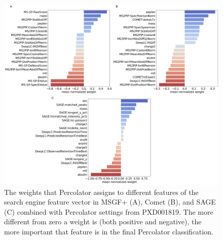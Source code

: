 \documentclass[12pt]{article}
\begin{document}


\renewcommand\thefigure{S\arabic{figure}}
\setcounter{figure}{0}

\begin{figure}[ht!]
	\centering
	\includegraphics[width=1\textwidth]{figures//LFQ_weights.png}
	\caption{The weights that Percolator assigns to different features of the search engine feature vector in MSGF+ (A), Comet (B), and SAGE (C) combined with Percolator settings from PXD001819. The more different from zero a weight is (both positive and negative), the more important that feature is in the final Percolator classification.}
	\label{fig:PXD001819_svm_weights}
\end{figure}
\end{document}

